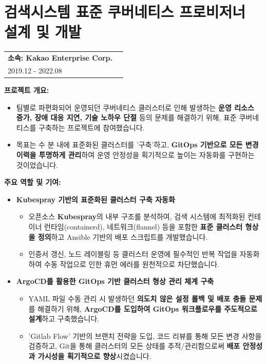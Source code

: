 \documentclass[letterpaper,11pt]{article}
\makeatletter
\newcommand{\resumeProject}[2]{
  \vspace{-1pt}\item
    \begin{tabular*}{0.97\textwidth}[t]{l@{\extracolsep{\fill}}r}
      \textbf{#1} \\
      \small{#2} \\
    \end{tabular*}\vspace{-5pt}
}
\makeatother
\begin{document}
\section{\textbf{검색시스템 표준 쿠버네티스 프로비저너 설계 및 개발}}
  \resumeProjectListStart
    \resumeProject
    {\textbf{소속}: Kakao Enterprise Corp.} {2019.12 - 2022.08}

    {
      \textbf{프로젝트 개요:}
      \begin{itemize}[leftmargin=*]
          \item 팀별로 파편화되어 운영되던 쿠버네티스 클러스터로 인해 발생하는 \textbf{운영 리소스 증가, 장애 대응 지연, 기술 노하우 단절} 등의 문제를 해결하기 위해, 표준 쿠버네티스를 구축하는 프로젝트에 참여했습니다.
          \item 목표는 수 분 내에 표준화된 클러스터를 '구축'하고, \textbf{GitOps 기반으로 모든 변경 이력을 투명하게 관리}하여 운영 안정성을 획기적으로 높이는 자동화를 구현하는 것이었습니다.
      \end{itemize}

      \textbf{주요 역할 및 기여:}
      \begin{itemize}[leftmargin=*]
          \item \textbf{Kubespray 기반의 표준화된 클러스터 구축 자동화}
              \begin{itemize}[leftmargin=*, label=$\circ$]
                  \item 오픈소스 \textbf{Kubespray}의 내부 구조를 분석하여, 검색 시스템에 최적화된 컨테이너 런타임(containerd), 네트워크(flannel) 등을 포함한 \textbf{표준 클러스터 형상을 정의}하고 Ansible 기반의 배포 스크립트를 개발했습니다.
                  \item 인증서 갱신, 노드 레이블링 등 클러스터 운영에 필수적인 반복 작업을 자동화하여 수동 작업으로 인한 휴먼 에러를 원천적으로 차단했습니다.
              \end{itemize}

          \item \textbf{ArgoCD를 활용한 GitOps 기반 클러스터 형상 관리 체계 구축}
              \begin{itemize}[leftmargin=*, label=$\circ$]
                  \item YAML 파일 수동 관리 시 발생하던 \textbf{의도치 않은 설정 롤백 및 배포 충돌 문제}를 해결하기 위해, \textbf{ArgoCD를 도입하여 GitOps 워크플로우를 주도적으로 설계}하고 구축했습니다.
                  \item 'Gitlab Flow' 기반의 브랜치 전략을 도입, 코드 리뷰를 통해 모든 변경 사항을 검증하고, Git을 통해 클러스터의 모든 상태를 추적/관리함으로써 \textbf{배포 안정성과 가시성을 획기적으로 향상}시켰습니다.
              \end{itemize}
              

\end{itemize}}
\end{document}
